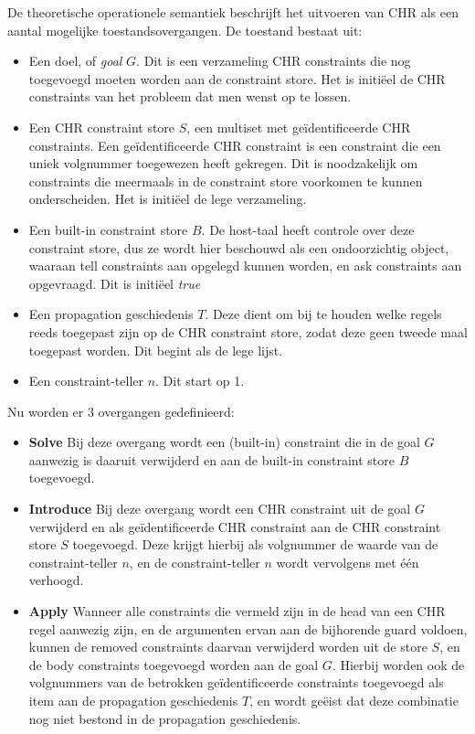 De theoretische operationele semantiek beschrijft het uitvoeren van CHR als een aantal mogelijke toestandsovergangen. De toestand bestaat uit: \begin{itemize}
\item Een doel, of {\em goal} $G$. Dit is een verzameling CHR constraints die nog toegevoegd moeten worden aan de constraint store. Het is initi\"eel de CHR constraints van het probleem dat men wenst op te lossen.
\item Een CHR constraint store $S$, een multiset met ge\"identificeerde CHR constraints. Een ge\"identificeerde CHR constraint is een constraint die een uniek volgnummer toegewezen heeft gekregen. Dit is noodzakelijk om constraints die meermaals in de constraint store voorkomen te kunnen onderscheiden. Het is initi\"eel de lege verzameling.
\item Een built-in constraint store $B$. De host-taal heeft controle over deze constraint store, dus ze wordt hier beschouwd als een ondoorzichtig object, waaraan tell constraints aan opgelegd kunnen worden, en ask constraints aan opgevraagd. Dit is initi\"eel {\em true}
\item Een propagation geschiedenis $T$. Deze dient om bij te houden welke regels reeds toegepast zijn op de CHR constraint store, zodat deze geen tweede maal toegepast worden. Dit begint als de lege lijst. 
\item Een constraint-teller $n$. Dit start op 1.
\end{itemize}

Nu worden er 3 overgangen gedefinieerd: \begin{itemize}
\item {\bf Solve} Bij deze overgang wordt een (built-in) constraint die in de goal $G$ aanwezig is daaruit verwijderd en aan de built-in constraint store $B$ toegevoegd. 
\item {\bf Introduce} Bij deze overgang wordt een CHR constraint uit de goal $G$ verwijderd en als ge\"identificeerde CHR constraint aan de CHR constraint store $S$ toegevoegd. Deze krijgt hierbij als volgnummer de waarde van de constraint-teller $n$, en de constraint-teller $n$ wordt vervolgens met \'e\'en verhoogd.
\item {\bf Apply} Wanneer alle constraints die vermeld zijn in de head van een CHR regel aanwezig zijn, en de argumenten ervan aan de bijhorende guard voldoen, kunnen de removed constraints daarvan verwijderd worden uit de store $S$, en de body constraints toegevoegd worden aan de goal $G$. Hierbij worden ook de volgnummers van de betrokken ge\"identificeerde constraints toegevoegd als item aan de propagation geschiedenis $T$, en wordt ge\"eist dat deze combinatie nog niet bestond in de propagation geschiedenis.
\end{itemize}

